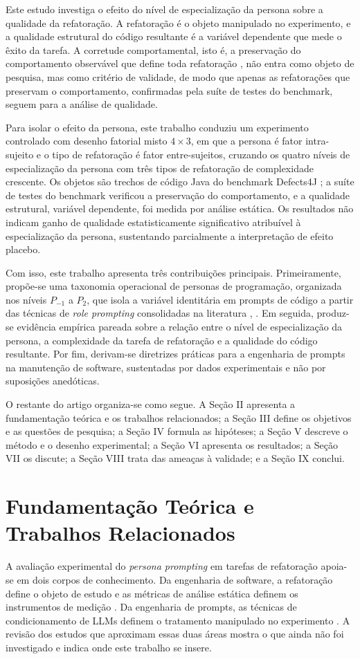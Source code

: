 \documentclass[10pt,conference,a4paper,twocolumn]{article}
\begin{document}
Este estudo investiga o efeito do nível de especialização da persona sobre a qualidade da refatoração. A refatoração é o objeto manipulado no experimento, e a qualidade estrutural do código resultante é a variável dependente que mede o êxito da tarefa. A corretude comportamental, isto é, a preservação do comportamento observável que define toda refatoração \cite{fowler}, não entra como objeto de pesquisa, mas como critério de validade, de modo que apenas as refatorações que preservam o comportamento, confirmadas pela suíte de testes do benchmark, seguem para a análise de qualidade.

Para isolar o efeito da persona, este trabalho conduziu um experimento controlado com desenho fatorial misto $4 \times 3$, em que a persona é fator intra-sujeito e o tipo de refatoração é fator entre-sujeitos, cruzando os quatro níveis de especialização da persona com três tipos de refatoração de complexidade crescente. Os objetos são trechos de código Java do benchmark Defects4J \cite{defects4j}; a suíte de testes do benchmark verificou a preservação do comportamento, e a qualidade estrutural, variável dependente, foi medida por análise estática. Os resultados não indicam ganho de qualidade estatisticamente significativo atribuível à especialização da persona, sustentando parcialmente a interpretação de efeito placebo.

Com isso, este trabalho apresenta três contribuições principais. Primeiramente, propõe-se uma taxonomia operacional de personas de programação, organizada nos níveis $P_{-1}$ a $P_2$, que isola a variável identitária em prompts de código a partir das técnicas de \textit{role prompting} consolidadas na literatura \cite{white2023}, \cite{schulhoff2024}. Em seguida, produz-se evidência empírica pareada sobre a relação entre o nível de especialização da persona, a complexidade da tarefa de refatoração e a qualidade do código resultante. Por fim, derivam-se diretrizes práticas para a engenharia de prompts na manutenção de software, sustentadas por dados experimentais e não por suposições anedóticas.

O restante do artigo organiza-se como segue. A Seção II apresenta a fundamentação teórica e os trabalhos relacionados; a Seção III define os objetivos e as questões de pesquisa; a Seção IV formula as hipóteses; a Seção V descreve o método e o desenho experimental; a Seção VI apresenta os resultados; a Seção VII os discute; a Seção VIII trata das ameaças à validade; e a Seção IX conclui.

\section{Fundamentação Teórica e Trabalhos Relacionados}
A avaliação experimental do \textit{persona prompting} em tarefas de refatoração apoia-se em dois corpos de conhecimento. Da engenharia de software, a refatoração define o objeto de estudo e as métricas de análise estática definem os instrumentos de medição \cite{fowler, mccabe1976}. Da engenharia de prompts, as técnicas de condicionamento de LLMs definem o tratamento manipulado no experimento \cite{white2023, schulhoff2024}. A revisão dos estudos que aproximam essas duas áreas mostra o que ainda não foi investigado e indica onde este trabalho se insere.
\end{document}
